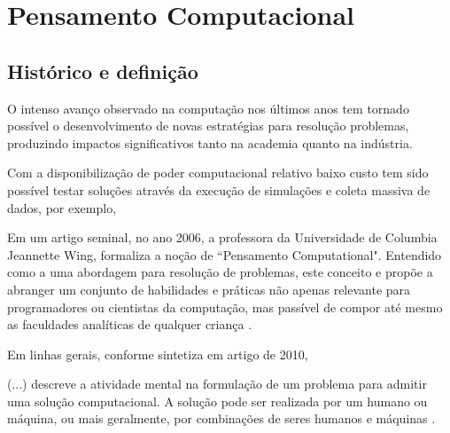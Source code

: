 \chapter{Pensamento Computacional}\label{pensamento-computacional}

\section{Histórico e definição}

O intenso avanço observado na computação nos últimos anos tem tornado possível o desenvolvimento de novas estratégias para resolução problemas, produzindo impactos significativos tanto na academia quanto na indústria.

Com a disponibilização de poder computacional relativo baixo custo tem sido possível testar soluções através da execução de simulações e coleta massiva de dados, por exemplo, 

Em um artigo seminal, no ano 2006,  a professora da Universidade de Columbia Jeannette Wing, formaliza a noção de ``Pensamento Computational". Entendido como a uma abordagem para resolução de problemas, este conceito e propõe a abranger um conjunto de habilidades e práticas não apenas relevante para programadores ou cientistas da computação, mas passível de compor até mesmo as faculdades analíticas de qualquer criança \cite{wing2006}.

Em linhas gerais, conforme sintetiza em artigo de 2010, 
  
\begin{citacao}
  (...) descreve a atividade mental na formulação de um problema para admitir 
uma solução computacional. A solução pode ser realizada por um humano ou máquina, 
ou mais geralmente, por combinações de seres humanos e máquinas \cite[tradução nossa]{Wing2010}.
\end{citacao}



